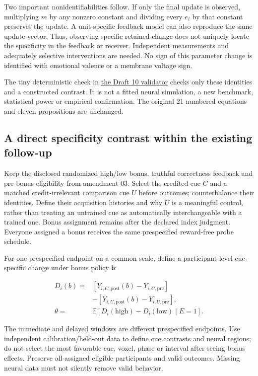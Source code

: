 \documentclass[
  american,
  11pt,
  letterpaper,
]{article}
\begin{document}
Two important nonidentifiabilities follow. If only the final update is observed, multiplying \(m\) by any nonzero constant and dividing every \(e_i\) by that constant preserves the update. A unit-specific feedback model can also reproduce the same update vector. Thus, observing specific retained change does not uniquely locate the specificity in the feedback or receiver. Independent measurements and adequately selective interventions are needed. No sign of this parameter change is identified with emotional valence or a membrane voltage sign.

The tiny deterministic check in \href{https://github.com/v5ma/v5ma.github.io/blob/master/papers/companions/learning-to-feel-v1.0/ARTIFACT-AVAILABILITY.md#artifact-31}{the Draft 10 validator} checks only these identities and a constructed contrast. It is not a fitted neural simulation, a new benchmark, statistical power or empirical confirmation. The original 21 numbered equations and eleven propositions are unchanged.

\subsection{A direct specificity contrast within the existing follow-up}\label{a-direct-specificity-contrast-within-the-existing-follow-up}

Keep the disclosed randomized high/low bonus, truthful correctness feedback and pre-bonus eligibility from amendment 03. Select the credited cue \(C\) and a matched credit-irrelevant comparison cue \(U\) before outcomes; counterbalance their identities. Define their acquisition histories and why \(U\) is a meaningful control, rather than treating an untrained cue as automatically interchangeable with a trained one. Bonus assignment remains after the declared index judgment. Everyone assigned a bonus receives the same prespecified reward-free probe schedule.

For one prespecified endpoint on a common scale, define a participant-level cue-specific change under bonus policy \texttt{b}:

\[\begin{aligned}D_i(b)={}&[Y_{i,C,\mathrm{post}}(b)-Y_{i,C,\mathrm{pre}}]\\&-[Y_{i,U,\mathrm{post}}(b)-Y_{i,U,\mathrm{pre}}],\\\theta={}&\mathbb E[D_i(\mathrm{high})-D_i(\mathrm{low})\mid E=1].\end{aligned}\]

The immediate and delayed windows are different prespecified endpoints. Use independent calibration/held-out data to define cue contrasts and neural regions; do not select the most favorable cue, voxel, phase or interval after seeing bonus effects. Preserve all assigned eligible participants and valid outcomes. Missing neural data must not silently remove valid behavior.
\end{document}
